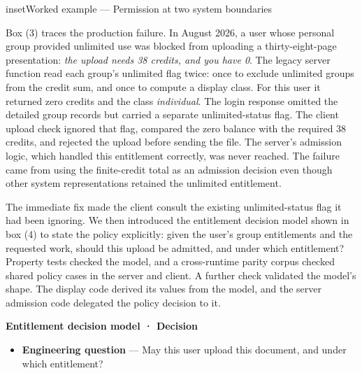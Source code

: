 \begin{bookbox}{inset}{Worked example --- Permission at two system boundaries}

Box (3) traces the production failure. In August 2026, a user whose personal group provided unlimited use was blocked from uploading a thirty-eight-page presentation: \emph{the upload needs 38 credits, and you have 0}. The legacy server function read each group's unlimited flag twice: once to exclude unlimited groups from the credit sum, and once to compute a display class. For this user it returned zero credits and the class \emph{individual}. The login response omitted the detailed group records but carried a separate unlimited-status flag. The client upload check ignored that flag, compared the zero balance with the required 38 credits, and rejected the upload before sending the file. The server's admission logic, which handled this entitlement correctly, was never reached. The failure came from using the finite-credit total as an admission decision even though other system representations retained the unlimited entitlement.


The immediate fix made the client consult the existing unlimited-status flag it had been ignoring. We then introduced the entitlement decision model shown in box (4) to state the policy explicitly: given the user's group entitlements and the requested work, should this upload be admitted, and under which entitlement? Property tests checked the model, and a cross-runtime parity corpus checked shared policy cases in the server and client. A further check validated the model's shape. The display code derived its values from the model, and the server admission code delegated the policy decision to it.

\textbf{Entitlement decision model · Decision}

\begin{itemize}
\tightlist
\item
  \textbf{Engineering question} --- May this user upload this document, and under which entitlement?
\end{itemize}


\end{bookbox}

